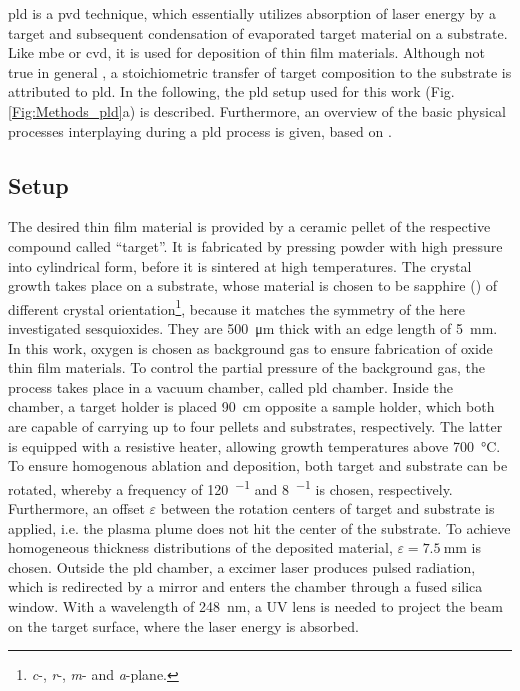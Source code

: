 \gls{pld} is a \gls{pvd} technique, which essentially utilizes absorption of laser energy by a target and subsequent condensation of evaporated target material on a substrate.
Like \gls{mbe} or \gls{cvd}, it is used for deposition of thin film materials.
Although not true in general \cite{lorenz2019}, a stoichiometric transfer of target composition to the substrate is attributed to \gls{pld}.
In the following, the \gls{pld} setup used for this work (Fig.\,\ref{Fig:Methods_pld}a) is described.
Furthermore, an overview of the basic physical processes interplaying during a \gls{pld} process is given, based on \textcite{lorenz2019}.

\subsection{Setup}\label{Sec:Methods_pld}
The desired thin film material is provided by a ceramic pellet of the respective compound called \enquote{target}.
It is fabricated by pressing powder with high pressure into cylindrical form, before it is sintered at high temperatures.
The crystal growth takes place on a substrate, whose material is chosen to be sapphire () of different crystal orientation\footnote{
    \textit{c}-, \textit{r}-, \textit{m}- and \textit{a}-plane.
}, because it matches the symmetry of the here investigated sesquioxides.
They are \qty{500}{\um} thick with an edge length of \qty{5}{\mm}.
%
In this work, oxygen is chosen as background gas to ensure fabrication of oxide thin film materials.
To control the partial pressure of the background gas, the process takes place in a vacuum chamber, called \gls{pld} chamber.
Inside the chamber, a target holder is placed \qty{90}{\cm} opposite a sample holder, which both are capable of carrying up to four pellets and substrates, respectively.
The latter is equipped with a resistive heater, allowing growth temperatures above \qty{700}{\celsius}.
To ensure homogenous ablation and deposition, both target and substrate can be rotated, whereby a frequency of \qty{120}{\min^{-1}} and \qty{8}{\min^{-1}} is chosen, respectively.
Furthermore, an offset $\varepsilon$ between the rotation centers of target and substrate is applied, i.e. the plasma plume does not hit the center of the substrate.
To achieve homogeneous thickness distributions of the deposited material, $\varepsilon=\qty{7.5}{\mm}$ is chosen.
Outside the \gls{pld} chamber, a  excimer laser produces pulsed radiation, which is redirected by a mirror and enters the chamber through a fused silica window.
With a wavelength of \qty{248}{\nm}, a UV lens is needed to project the beam on the target surface, where the laser energy is absorbed.
